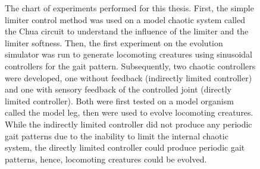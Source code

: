 \documentclass[main]{subfiles}
\begin{document}
\begin{figure}[H]
\centering
\hspace*{-8.5em}


\caption[The experiments chart]{The chart of experiments performed for this thesis. First, the simple limiter control method was used on a model chaotic system called the Chua circuit to understand the influence of the limiter and the limiter softness. Then, the first experiment on the evolution simulator was run to generate locomoting creatures using sinusoidal controllers for the gait pattern. Subsequently, two chaotic controllers were developed, one without feedback (indirectly limited controller) and one with sensory feedback of the controlled joint (directly limited controller). Both were first tested on a model organism called the model leg, then were used to evolve locomoting creatures. While the indirectly limited controller did not produce any periodic gait patterns due to the inability to limit the internal chaotic system, the directly limited controller could produce periodic gait patterns, hence, locomoting creatures could be evolved.}
\label{figure:experiments-chart}
\end{figure}
\end{document}
